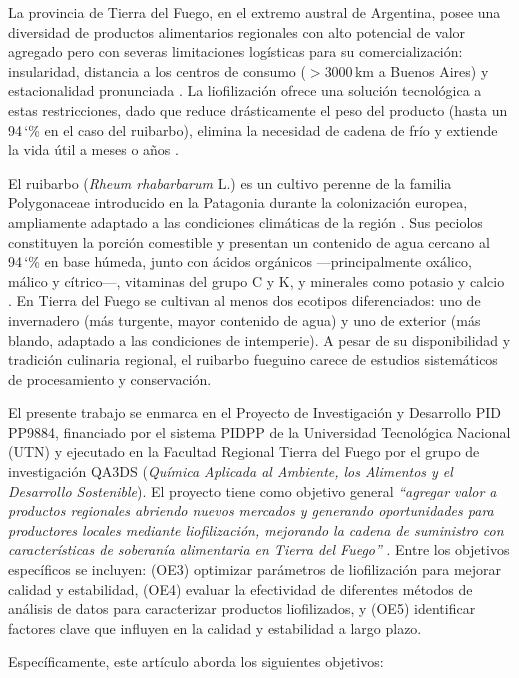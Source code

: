 \documentclass[12pt, a4paper]{article}
\newcommand{\pct}{\char`\%}
\begin{document}
La provincia de Tierra del Fuego, en el extremo austral de Argentina, posee una diversidad de productos alimentarios regionales con alto potencial de valor agregado pero con severas limitaciones logísticas para su comercialización: insularidad, distancia a los centros de consumo ($>3000$\,km a Buenos Aires) y estacionalidad pronunciada \citep{giamportone2023}. La liofilización ofrece una solución tecnológica a estas restricciones, dado que reduce drásticamente el peso del producto (hasta un 94\,\pct{} en el caso del ruibarbo), elimina la necesidad de cadena de frío y extiende la vida útil a meses o años \citep{ratti2001}.

El ruibarbo (\textit{Rheum rhabarbarum} L.) es un cultivo perenne de la familia Polygonaceae introducido en la Patagonia durante la colonización europea, ampliamente adaptado a las condiciones climáticas de la región \citep{foust1992}. Sus peciolos constituyen la porción comestible y presentan un contenido de agua cercano al 94\,\pct{} en base húmeda, junto con ácidos orgánicos ---principalmente oxálico, málico y cítrico---, vitaminas del grupo C y K, y minerales como potasio y calcio \citep{usda2019}. En Tierra del Fuego se cultivan al menos dos ecotipos diferenciados: uno de invernadero (más turgente, mayor contenido de agua) y uno de exterior (más blando, adaptado a las condiciones de intemperie). A pesar de su disponibilidad y tradición culinaria regional, el ruibarbo fueguino carece de estudios sistemáticos de procesamiento y conservación.

El presente trabajo se enmarca en el Proyecto de Investigación y Desarrollo PID PP9884, financiado por el sistema PIDPP de la Universidad Tecnológica Nacional (UTN) y ejecutado en la Facultad Regional Tierra del Fuego por el grupo de investigación QA3DS (\textit{Química Aplicada al Ambiente, los Alimentos y el Desarrollo Sostenible}). El proyecto tiene como objetivo general \textit{``agregar valor a productos regionales abriendo nuevos mercados y generando oportunidades para productores locales mediante liofilización, mejorando la cadena de suministro con características de soberanía alimentaria en Tierra del Fuego''} \citep{giamportone2023}. Entre los objetivos específicos se incluyen: (OE3) optimizar parámetros de liofilización para mejorar calidad y estabilidad, (OE4) evaluar la efectividad de diferentes métodos de análisis de datos para caracterizar productos liofilizados, y (OE5) identificar factores clave que influyen en la calidad y estabilidad a largo plazo.

Específicamente, este artículo aborda los siguientes objetivos:
\end{document}
